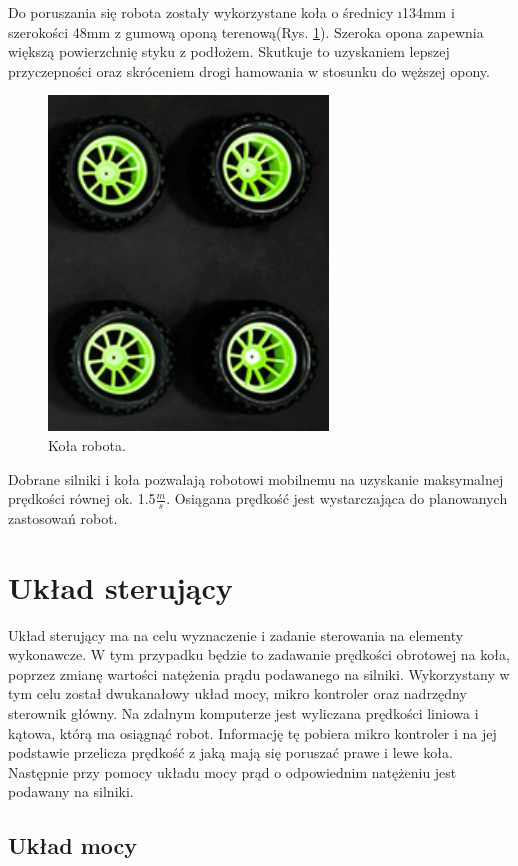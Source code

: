 Do poruszania się robota zostały wykorzystane koła o średnicy \i134mm i szerokości 48mm z gumową oponą terenową(Rys. \ref{fig:koła}). Szeroka opona zapewnia  większą powierzchnię styku z podłożem. Skutkuje to uzyskaniem lepszej przyczepności oraz skróceniem drogi hamowania w stosunku do węższej opony.
\begin{figure}[ht]
	\centering
	\includegraphics[scale=0.8]{koła.png}
	\caption{Koła robota.}
	\label{fig:koła}
\end{figure}

Dobrane silniki i koła pozwalają robotowi mobilnemu na uzyskanie maksymalnej prędkości równej ok. 1.5$\frac{m}{s}$. Osiągana prędkość jest wystarczająca do planowanych zastosowań robot.

\section{Układ sterujący}

Układ sterujący ma na celu wyznaczenie i zadanie sterowania na elementy wykonawcze. W tym przypadku będzie to zadawanie  prędkości obrotowej na koła, poprzez zmianę wartości natężenia prądu podawanego na silniki.  Wykorzystany w tym celu został dwukanałowy układ mocy, mikro kontroler oraz nadrzędny sterownik główny. Na zdalnym komputerze jest wyliczana prędkości liniowa i kątowa, którą ma osiągnąć robot. Informację tę pobiera mikro kontroler i na jej podstawie przelicza prędkość z jaką mają się poruszać prawe i lewe koła. Następnie przy pomocy układu mocy prąd o odpowiednim natężeniu jest podawany na silniki. 


\subsection{Układ mocy}

